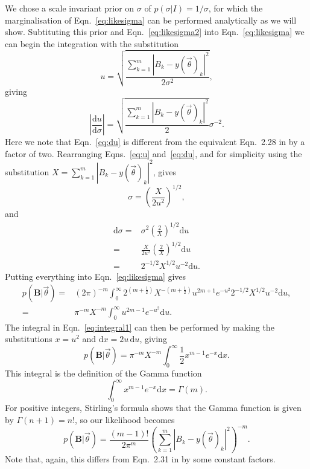 We chose a scale invariant prior on $\sigma$ of $p(\sigma|I) = 1/\sigma$, for which the marginalisation of
Eqn.~\ref{eq:likesigma} can be performed analytically as we will show.
Subtituting this prior and Eqn.~\ref{eq:likesigma2} into Eqn.~\ref{eq:likesigma} we can begin the
integration with the substitution
\begin{equation}\label{eq:u}
u = \sqrt{\frac{\sum_{k=1}^m|B_k-y(\vec{\theta})_k|^2}{2\sigma^2}},
\end{equation}
giving
\begin{equation}\label{eq:du}
\left|\frac{\text{d}u}{\text{d}\sigma}\right| = \sqrt{\frac{\sum_{k=1}^m|B_k-y(\vec{\theta})_k|^2}{2}}\sigma^{-2}.
\end{equation}
Here we note that Eqn.~\ref{eq:du} is different from the equivalent Eqn.~2.28 in \citet{Dupuisthesis} by a
factor of two. Rearranging Eqns.~\ref{eq:u} and~\ref{eq:du}, and for simplicity using the substitution $X =
\sum_{k=1}^m |B_k-y(\vec{\theta})_k|^2$, gives
\begin{equation}
\sigma = \left(\frac{X}{2u^2}\right)^{1/2},
\end{equation}
and
\begin{align}
\text{d}\sigma = & \sigma^2 \left(\frac{2}{X}\right)^{1/2} \text{d}u
\nonumber \\
 = & \frac{X}{2u^2} \left(\frac{2}{X}\right)^{1/2} \text{d}u \nonumber \\
 = & 2^{-1/2} X^{1/2} u^{-2} \text{d}u.
\end{align}
Putting everything into Eqn.~\ref{eq:likesigma} gives
\begin{align}
p(\mathbf{B}|\vec{\theta})= & (2\pi)^{-m} \int_0^{\infty} 2^{(m+\frac{1}{2})}
X^{-(m+\frac{1}{2})} u^{2m+1} e^{-u^2} 2^{-1/2} X^{1/2} u^{-2} \text{d}u, \nonumber \\
 = & \pi^{-m} X^{-m} \int_0^{\infty} u^{2m-1} e^{-u^2} \text{d}u. \label{eq:integral1}
\end{align}
The integral in Eqn.~\ref{eq:integral1} can then be performed by making the substitutions $x = u^2$ and $\text{d}x
= 2u\,\text{d}u$, giving
\begin{equation}
p(\mathbf{B}|\vec{\theta}) = \pi^{-m} X^{-m} \int_0^{\infty} \frac{1}{2} x^{m-1} e^{-x}
\text{d}x.
\end{equation}
This integral is the definition of the Gamma function
\begin{equation}
 \int_0^{\infty} x^{m-1} e^{-x} \text{d}x = \Gamma(m).
\end{equation}
For positive integers, Stirling's formula shows that the Gamma function is given by $\Gamma(n+1) = n!$, so our
likelihood becomes
\begin{equation}\label{eq:complex}
p(\mathbf{B}|\vec{\theta}) = \frac{(m-1)!}{2\pi^m} \left(\sum_{k=1}^m
|B_k-y(\vec{\theta})_k|^2\right)^{-m}.
\end{equation}
Note that, again, this differs from Eqn.~2.31 in \citet{Dupuisthesis} by some constant factors.

